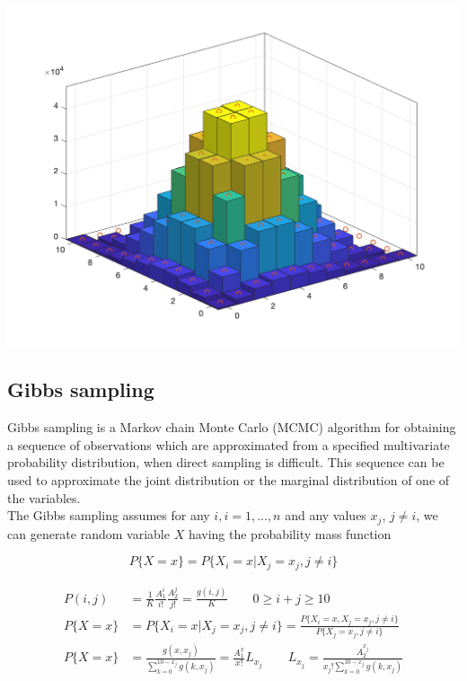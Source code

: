 \begin{center}
    \includegraphics[scale=0.6]{Figures/figure6_4.png}\\
\end{center}

\subsection{Gibbs sampling}
Gibbs sampling is a Markov chain Monte Carlo (MCMC) algorithm for obtaining a sequence of observations which are approximated from a specified multivariate probability distribution, when direct sampling is difficult. This sequence can be used to approximate the joint distribution or the marginal distribution of one of the variables.\\
The Gibbs sampling assumes for any $i,i=1,...,n$ and any values $x_j$, $j\neq i$, we can generate random variable $X$ having the probability mass function

\begin{equation}
    P\{X=x\} = P\{X_{i}=x|X_{j}=x_{j},j\neq i\}
\end{equation}

\begin{align}
    P(i, j) &= \frac{1}{K} \frac{A_1^i}{i !} \frac{A_2^j}{j !} = \frac{g(i, j)}{K} \qquad 0 \geq i + j \geq 10 \\
    P\{X=x\} &= P\{X_{i}=x|X_{j}=x_{j},j\neq i\} = \frac{P\{X_{i}=x, X_{j}=x_{j},j\neq i\}}{P\{X_{j}=x_{j},j\neq i\}} \\
    P\{X=x\} &= \frac{g(x, x_{j})}{\sum_{k = 0}^{10 - x_{j}} g(k, x_{j})} = \frac{A_1^x}{x !} L_{x_{j}} \qquad L_{x_{j}} =  \frac{ A_2^{x_{j}}}{ x_{j} ! \sum_{k = 0}^{10 - x_{j}} g(k, x_{j})} 
\end{align}

